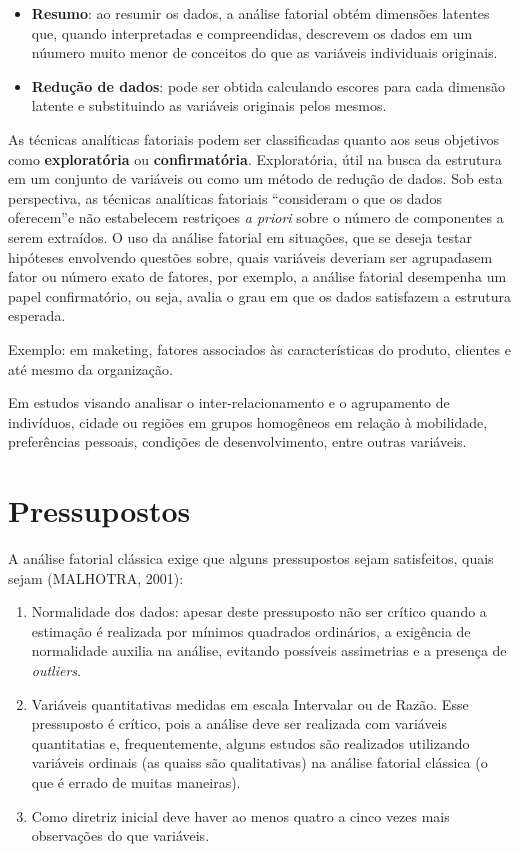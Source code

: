 \documentclass[12pt,brazil,oneside]{book}
\begin{document}
\begin{itemize}
\item
  \textbf{Resumo}: ao resumir os dados, a análise fatorial obtém
  dimensões latentes que, quando interpretadas e compreendidas,
  descrevem os dados em um núumero muito menor de conceitos do que as
  variáveis individuais originais.
\item
  \textbf{Redução de dados}: pode ser obtida calculando escores para
  cada dimensão latente e substituindo as variáveis originais pelos
  mesmos.
\end{itemize}

As técnicas analíticas fatoriais podem ser classificadas quanto aos seus
objetivos como \textbf{exploratória} ou \textbf{confirmatória}.
Exploratória, útil na busca da estrutura em um conjunto de variáveis ou
como um método de redução de dados. Sob esta perspectiva, as técnicas
analíticas fatoriais ``consideram o que os dados oferecem''e não
estabelecem restriçoes \emph{a priori} sobre o número de componentes a
serem extraídos. O uso da análise fatorial em situações, que se deseja
testar hipóteses envolvendo questões sobre, quais variáveis deveriam ser
agrupadasem fator ou número exato de fatores, por exemplo, a análise
fatorial desempenha um papel confirmatório, ou seja, avalia o grau em
que os dados satisfazem a estrutura esperada.

Exemplo: em maketing, fatores associados às características do produto,
clientes e até mesmo da organização.

Em estudos visando analisar o inter-relacionamento e o agrupamento de
indivíduos, cidade ou regiões em grupos homogêneos em relação à
mobilidade, preferências pessoais, condições de desenvolvimento, entre
outras variáveis.

\hypertarget{pressupostos}{%
\section{Pressupostos}\label{pressupostos}}

A análise fatorial clássica exige que alguns pressupostos sejam
satisfeitos, quais sejam (MALHOTRA, 2001):

\begin{enumerate}
\def\labelenumi{\alph{enumi}.}
\item
  Normalidade dos dados: apesar deste pressuposto não ser crítico quando
  a estimação é realizada por mínimos quadrados ordinários, a exigência
  de normalidade auxilia na análise, evitando possíveis assimetrias e a
  presença de \emph{outliers}.
\item
  Variáveis quantitativas medidas em escala Intervalar ou de Razão. Esse
  pressuposto é crítico, pois a análise deve ser realizada com variáveis
  quantitatias e, frequentemente, alguns estudos são realizados
  utilizando variáveis ordinais (as quaiss são qualitativas) na análise
  fatorial clássica (o que é errado de muitas maneiras).
\item
  Como diretriz inicial deve haver ao menos quatro a cinco vezes mais
  observações do que variáveis.
\end{enumerate}
\end{document}
